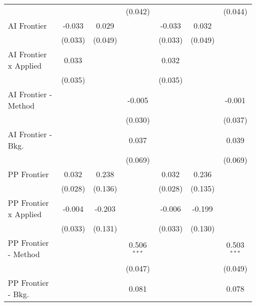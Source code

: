 \begin{tabular}{lcccccc}
                                  &                &              & (0.042)        &                &              & (0.044)\\   
   AI Frontier                    & -0.033         & 0.029        &                & -0.033         & 0.032        &   \\   
                                  & (0.033)        & (0.049)      &                & (0.033)        & (0.049)      &   \\   
   AI Frontier x Applied          & 0.033          &              &                & 0.032          &              &   \\   
                                  & (0.035)        &              &                & (0.035)        &              &   \\   
   AI Frontier - Method           &                &              & -0.005         &                &              & -0.001\\   
                                  &                &              & (0.030)        &                &              & (0.037)\\   
   AI Frontier - Bkg.             &                &              & 0.037          &                &              & 0.039\\   
                                  &                &              & (0.069)        &                &              & (0.069)\\   
   PP Frontier                    & 0.032          & 0.238        &                & 0.032          & 0.236        &   \\   
                                  & (0.028)        & (0.136)      &                & (0.028)        & (0.135)      &   \\   
   PP Frontier x Applied          & -0.004         & -0.203       &                & -0.006         & -0.199       &   \\   
                                  & (0.033)        & (0.131)      &                & (0.033)        & (0.130)      &   \\   
   PP Frontier - Method           &                &              & 0.506$^{***}$  &                &              & 0.503$^{***}$\\   
                                  &                &              & (0.047)        &                &              & (0.049)\\   
   PP Frontier - Bkg.             &                &              & 0.081          &                &              & 0.078\\   

\end{tabular}
